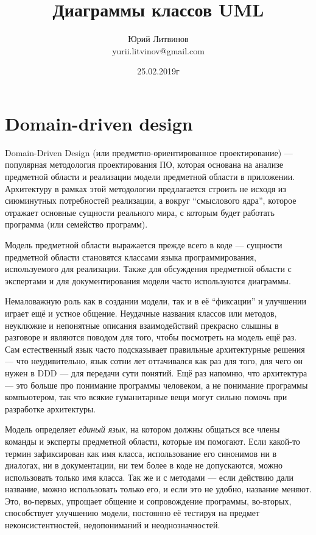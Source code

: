 \documentclass[a5paper]{article}
\title{Диаграммы классов UML}
\author{Юрий Литвинов\\\small{yurii.litvinov@gmail.com}}
\date{25.02.2019г}
\begin{document}
\maketitle
\thispagestyle{empty}

\section{Domain-driven design}

 Domain-Driven Design (или предметно-ориентированное проектирование) --- популярная методология проектирования ПО, которая основана на анализе предметной области и реализации модели предметной области в приложении. Архитектуру в рамках этой методологии предлагается строить не исходя из сиюминутных потребностей реализации, а вокруг ``смыслового ядра'', которое отражает основные сущности реального мира, с которым будет работать программа (или семейство программ).

Модель предметной области выражается прежде всего в коде --- сущности предметной области становятся классами языка программирования, используемого для реализации. Также для обсуждения предметной области с экспертами и для документирования модели часто используются диаграммы.

Немаловажную роль как в создании модели, так и в её ``фиксации'' и улучшении играет ещё и устное общение. Неудачные названия классов или методов, неуклюжие и непонятные описания взаимодействий прекрасно слышны в разговоре и являются поводом для того, чтобы посмотреть на модель ещё раз. Сам естественный язык часто подсказывает правильные архитектурные решения --- что неудивительно, язык сотни лет оттачивался как раз для того, для чего он нужен в DDD --- для передачи сути понятий. Ещё раз напомню, что архитектура --- это больше про понимание программы человеком, а не понимание программы компьютером, так что всякие гуманитарные вещи могут сильно помочь при разработке архитектуры.

Модель определяет \textit{единый язык}, на котором должны общаться все члены команды и эксперты предметной области, которые им помогают. Если какой-то термин зафиксирован как имя класса, использование его синонимов ни в диалогах, ни в документации, ни тем более в коде не допускаются, можно использовать только имя класса. Так же и с методами --- если действию дали название, можно использовать только его, и если это не удобно, название меняют. Это, во-первых, упрощает общение и сопровождение программы, во-вторых, способствует улучшению модели, постоянно её тестируя на предмет неконсистентностей, недопониманий и неоднозначностей.
\end{document}
